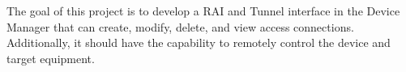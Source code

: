 The goal of this project is to develop a RAI and Tunnel interface 
in the Device Manager that can create, modify, delete, 
and view access connections. 
Additionally, it should have the capability 
to remotely control the device and target equipment.
